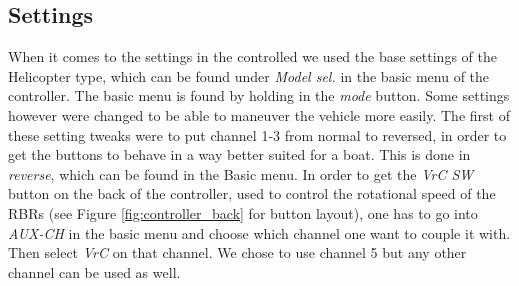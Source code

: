 \subsection{Settings}
When it comes to the settings in the controlled we used the base settings of the Helicopter type, which can be found under \textit{Model sel.} in the basic menu of the controller. The basic menu is found by holding in the \textit{mode} button. Some settings however were changed to be able to maneuver the vehicle more easily. The first of these setting tweaks were to put channel 1-3 from normal to reversed, in order to get the buttons to behave in a way better suited for a boat. This is done in \textit{reverse}, which can be found in the Basic menu. In order to get the \textit{VrC SW} button on the back of the controller, used to control the rotational speed of the RBRs (see Figure \ref{fig:controller_back} for button layout), one has to go into \textit{AUX-CH} in the basic menu and choose which channel  one want to couple it with. Then select \textit{VrC} on that channel. We chose to use channel 5 but any other channel can be used as well.
